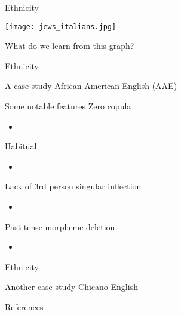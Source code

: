 \documentclass{beamer}
\newcommand{\subonefive}{Ethnicity}
\begin{document}
      \begin{frame}{\subonefive}
        \begin{center}
          \texttt{[image: jews\_italians.jpg]}
        \end{center}
        \begin{block}{What do we learn from this graph?}
        \end{block}
      \end{frame}

      \begin{frame}{\subonefive}
        \begin{block}{A case study}
          African-American English (AAE)
        \end{block}
        \begin{block}{Some notable features}
          Zero copula
          \begin{itemize}
            \item {}
          \end{itemize}
          Habitual 
          \begin{itemize}
            \item {}
          \end{itemize}
          Lack of 3rd person singular inflection %
          \begin{itemize}
            \item {}
          \end{itemize}
          Past tense morpheme deletion %
          \begin{itemize}
            \item {}
          \end{itemize}
        \end{block}
      \end{frame}

      \begin{frame}[t]{\subonefive}
        \begin{block}{Another case study}
          Chicano English
        \end{block}
      \end{frame}

      \begin{frame}{References}
      \end{frame}
\end{document}
